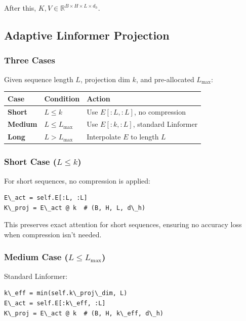 After this, $K, V \in \mathbb{R}^{B \times H \times L \times d_h}$.

\subsection{Adaptive Linformer Projection}

\subsubsection{Three Cases}

Given sequence length $L$, projection dim $k$, and pre-allocated $L_\text{max}$:

\begin{table}[H]
\centering
\small
\begin{tabular}{lll}
\toprule
\textbf{Case} & \textbf{Condition} & \textbf{Action} \\
\midrule
\textbf{Short} & $L \leq k$ & Use $E[:L, :L]$, no compression \\
\textbf{Medium} & $L \leq L_\text{max}$ & Use $E[:k, :L]$, standard Linformer \\
\textbf{Long} & $L > L_\text{max}$ & Interpolate $E$ to length $L$ \\
\bottomrule
\end{tabular}
\end{table}

\subsubsection{Short Case ($L \leq k$)}

For short sequences, no compression is applied:

\begin{lstlisting}
E\_act = self.E[:L, :L]
K\_proj = E\_act @ k  # (B, H, L, d\_h)
\end{lstlisting}

This preserves exact attention for short sequences, ensuring no accuracy 
loss when compression isn't needed.

\subsubsection{Medium Case ($L \leq L_\text{max}$)}

Standard Linformer:

\begin{lstlisting}
k\_eff = min(self.k\_proj\_dim, L)
E\_act = self.E[:k\_eff, :L]
K\_proj = E\_act @ k  # (B, H, k\_eff, d\_h)
\end{lstlisting}

